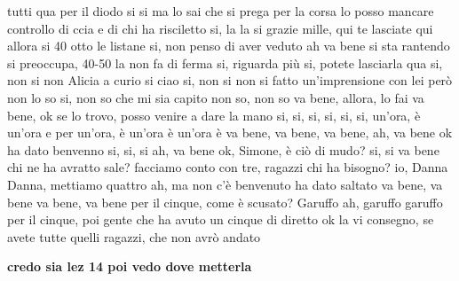 tutti qua per il diodo si si ma lo sai che si prega per la corsa lo posso mancare controllo di ccia e di chi ha risciletto si, la la si grazie mille, qui te lasciate qui allora si 40 otto le listane si, non penso di aver veduto ah va bene si sta rantendo si preoccupa, 40-50 la non fa di ferma si, riguarda più si, potete lasciarla qua si, non si non Alicia a curio si ciao si, non si non si fatto un'imprensione con lei però non lo so si, non so che mi sia capito non so, non so va bene, allora, lo fai va bene, ok se lo trovo, posso venire a dare la mano si, si, si, si, si, si, un'ora, è un'ora e per un'ora, è un'ora è un'ora è va bene, va bene, va bene, ah, va bene ok ha dato benvenno si, si, si ah, va bene ok, Simone, è ciò di mudo? si, si va bene chi ne ha avratto sale? facciamo conto con tre, ragazzi chi ha bisogno? io, Danna Danna, mettiamo quattro ah, ma non c'è benvenuto ha dato saltato va bene, va bene va bene, va bene per il cinque, come è scusato? Garuffo ah, garuffo garuffo per il cinque, poi gente che ha avuto un cinque di diretto ok la vi consegno, se avete tutte quelli ragazzi, che non avrò andato

\textbf{credo sia lez 14 poi vedo dove metterla}

